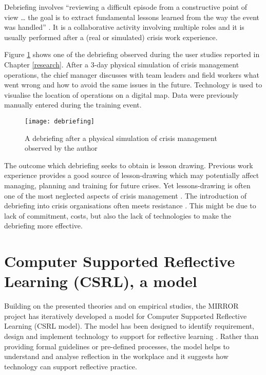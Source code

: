 Debriefing involves ``reviewing a difficult episode from a constructive point of view \ldots{} the goal is to extract fundamental lessons learned from the way the event was handled'' \autocite{Lagadec:1997js}. It is a collaborative activity involving multiple roles and it is usually performed after a (real or simulated) crisis work experience. 

Figure \ref{fig:debriefing-example} shows one of the debriefing observed during the user studies reported in Chapter \ref{research}. After a 3-day physical simulation of crisis management operations, the chief manager discusses with team leaders and field workers what went wrong and how to avoid the same issues in the future. Technology is used to visualise the location of operations on a digital map. Data were previously manually entered during the training event.

\begin{figure}
	[tbh] \centering 
	\texttt{[image: debriefing]} \caption{A debriefing after a physical simulation of crisis management observed by the author} \label{fig:debriefing-example} 
\end{figure}

The outcome which debriefing seeks to obtain is lesson drawing. Previous work experience provides a good source of lesson-drawing which may potentially affect managing, planning and training for future crises. Yet lessons-drawing is often one of the most neglected aspects of crisis management \autocites{Lagadec:1997js}{Stern:1997eb}. The introduction of debriefing into crisis organisations often meets resistance \autocite{Lagadec:1997js}. This might be due to lack of commitment, costs, but also the lack of technologies to make the debriefing more effective.

\section{Computer Supported Reflective Learning (CSRL), a model}\label{computer-supported-reflective-learning-a-model}

Building on the presented theories and on empirical studies, the MIRROR project has iteratively developed a model for Computer Supported Reflective Learning (CSRL model). The model has been designed to identify requirement, design and implement technology to support for reflective learning \autocite{Krogstie:2013kf}. Rather than providing formal guidelines or pre-defined processes, the model helps to understand and analyse reflection in the workplace and it suggests how technology can support reflective practice.

